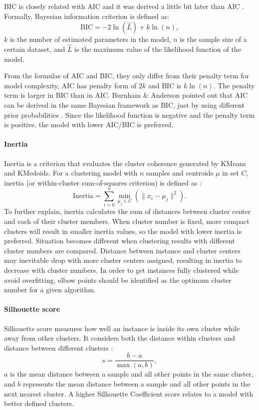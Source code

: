 \documentclass[a4paper]{article}
\begin{document}
BIC is closely related with AIC and it was derived a little bit later than AIC \cite{BIC}. Formally, Bayesian information criterion is defined as:
\begin{equation}
    \text{BIC}=-2\ln(\hat{L})+k\ln(n),
    \label{Eq: BIC}
\end{equation}
\noindent \(k\) is the number of estimated parameters in the model, \(n\) is the sample size of a certain dataset, and \(\hat{L}\) is the maximum value of the likelihood function of the model.

From the formulae of AIC and BIC, they only differ from their penalty term for model complexity, AIC has penalty form of \(2k\) and BIC is \(k\ln(n)\). The penalty term is larger in BIC than in AIC. Burnham \& Anderson pointed out that AIC can be derived in the same Bayesian framework as BIC, just by using different prior probabilities \cite{AIC_BIC_comparison}\cite{AIC_BIC_book}. Since the likelihood function is negative and the penalty term is positive, the model with lower AIC/BIC is preferred.

\paragraph{Inertia}
Inertia is a criterion that evaluates the cluster coherence generated by KMeans and KMedoids. For a clustering model with \(n\) samples and centroids \(\mu\) in set \(C\), inertia (or within-cluster sum-of-squares criterion) is defined as \cite{scikit-learn}:
\begin{equation}
    \text{Inertia}=\sum_{i=0}^{n}\min_{\mu_{j} \in C} \left( \parallel x_i - \mu_j\parallel^2 \right).
    \label{Eq: inertia}
\end{equation}
\noindent To further explain, inertia calculates the sum of distances between cluster center and each of their cluster members. When cluster number is fixed, more compact clusters will result in smaller inertia values, so the model with lower inertia is preferred. Situation becomes different when clustering results with different cluster numbers are compared. Distance between instance and cluster centers may inevitable drop with more cluster centers assigned, resulting in inertia to decrease with cluster numbers. In order to get instances fully clustered while avoid overfitting, elbow points should be identified as the optimum cluster number for a given algorithm.

\paragraph{Silhouette score}
Silhouette score measures how well an instance is inside its own cluster while away from other clusters. It considers both the distance within clusters and distance between different clusters \cite{scikit-learn}:
\begin{equation}
    s = \frac{b-a}{\max(a, b)},
    \label{Eq: Silhouette score}
\end{equation}
\noindent \(a\) is the mean distance between a sample and all other points in the same cluster, and \(b\) represents the mean distance between a sample and all other points in the next nearest cluster. A higher Silhouette Coefficient score relates to a model with better defined clusters. 
\end{document}
